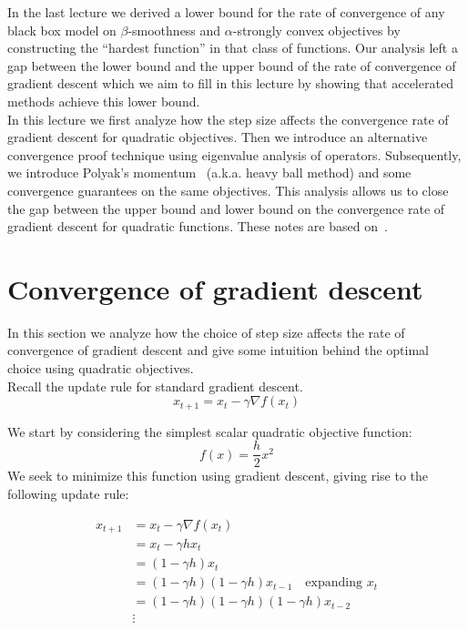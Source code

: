 \documentclass{article}
\begin{document}
In the last lecture we derived a lower bound for the rate of convergence of any black box model on $\beta$-smoothness and $\alpha$-strongly convex objectives by constructing the ``hardest function'' in that class of functions. Our analysis left a gap between the lower bound and the upper bound of the rate of convergence of gradient descent which we aim to fill in this lecture by showing that accelerated methods achieve this lower bound.
\\
 
In this lecture we first analyze how the step size affects the convergence rate of gradient descent for quadratic objectives. Then we introduce an alternative convergence proof technique using eigenvalue analysis of operators. Subsequently, we introduce Polyak's momentum~\cite{polyak1964some} (a.k.a. heavy ball method) and some convergence guarantees on the same objectives. This analysis allows us to close the gap between the upper bound and lower bound on the convergence rate of gradient descent for quadratic functions. These notes are based on~\cite{goh2017why, zhang2017yellowfin, nesterov1998introductory}.

\section{Convergence of gradient descent}

In this section we analyze how the choice of step size affects the rate of convergence of gradient descent and give some intuition behind the optimal choice using quadratic objectives.
\\

Recall the update rule for standard gradient descent.
\begin{equation}
x_{t+1}=x_t - \gamma \nabla f(x_t)
\end{equation}

We start by considering the simplest scalar quadratic objective function:
\begin{equation}
	f(x) = \frac{h}{2} x^2
\end{equation}
We seek to minimize this function using gradient descent, giving rise to the following update rule:

\begin{align*}
	x_{t+1} &=x_t - \gamma \nabla f(x_t) \\
            &= x_t -\gamma h x_t \\
            &=(1 - \gamma h) x_t \\
            &=(1 - \gamma h) (1 - \gamma h) x_{t - 1} \quad \text{expanding $x_t$} \\
            &=(1 - \gamma h)(1 - \gamma h)(1 - \gamma h) x_{t - 2} \\
            &\vdots
\end{align*}
\end{document}
